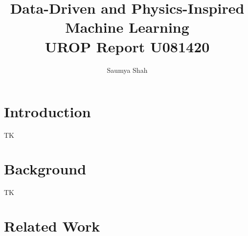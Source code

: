 \documentclass[fleqn,10pt]{olplainarticle}
\title{Data-Driven and Physics-Inspired Machine Learning\\[1ex] \large UROP Report U081420}
\author{Saumya Shah}
\begin{document}
\maketitle

\flushbottom

\thispagestyle{empty}

\tableofcontents

\section{Introduction}
TK

\section{Background}
TK

\section{Related Work}
\end{document}

